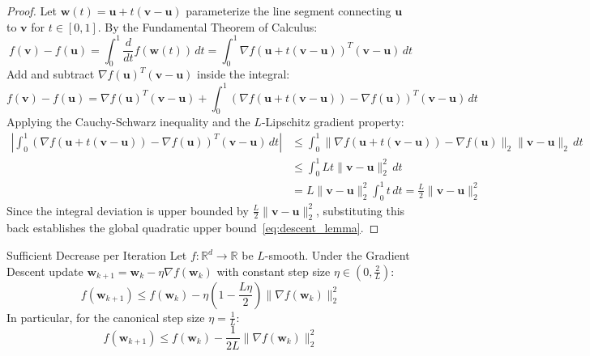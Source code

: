 \begin{proof}
Let $\mathbf{w}(t) = \mathbf{u} + t(\mathbf{v} - \mathbf{u})$ parameterize the line segment connecting $\mathbf{u}$ to $\mathbf{v}$ for $t \in [0, 1]$. By the Fundamental Theorem of Calculus:
\begin{equation}
f(\mathbf{v}) - f(\mathbf{u}) = \int_0^1 \frac{d}{dt} f(\mathbf{w}(t)) \, dt = \int_0^1 \nabla f(\mathbf{u} + t(\mathbf{v} - \mathbf{u}))^T (\mathbf{v} - \mathbf{u}) \, dt
\end{equation}
Add and subtract $\nabla f(\mathbf{u})^T (\mathbf{v} - \mathbf{u})$ inside the integral:
\begin{equation}
f(\mathbf{v}) - f(\mathbf{u}) = \nabla f(\mathbf{u})^T (\mathbf{v} - \mathbf{u}) + \int_0^1 \left( \nabla f(\mathbf{u} + t(\mathbf{v} - \mathbf{u})) - \nabla f(\mathbf{u}) \right)^T (\mathbf{v} - \mathbf{u}) \, dt
\end{equation}
Applying the Cauchy-Schwarz inequality and the $L$-Lipschitz gradient property:
\begin{align}
\left| \int_0^1 \left( \nabla f(\mathbf{u} + t(\mathbf{v} - \mathbf{u})) - \nabla f(\mathbf{u}) \right)^T (\mathbf{v} - \mathbf{u}) \, dt \right|
&\le \int_0^1 \|\nabla f(\mathbf{u} + t(\mathbf{v} - \mathbf{u})) - \nabla f(\mathbf{u})\|_2 \|\mathbf{v} - \mathbf{u}\|_2 \, dt \nonumber \\
&\le \int_0^1 L t \|\mathbf{v} - \mathbf{u}\|_2^2 \, dt \nonumber \\
&= L \|\mathbf{v} - \mathbf{u}\|_2^2 \int_0^1 t \, dt = \frac{L}{2} \|\mathbf{v} - \mathbf{u}\|_2^2
\end{align}
Since the integral deviation is upper bounded by $\frac{L}{2} \|\mathbf{v} - \mathbf{u}\|_2^2$, substituting this back establishes the global quadratic upper bound~\eqref{eq:descent_lemma}.
\end{proof}

\begin{theorembox}{Sufficient Decrease per Iteration}
Let $f: \mathbb{R}^d \to \mathbb{R}$ be $L$-smooth. Under the Gradient Descent update $\mathbf{w}_{k+1} = \mathbf{w}_k - \eta \nabla f(\mathbf{w}_k)$ with constant step size $\eta \in \left(0, \frac{2}{L}\right)$:
\begin{equation}
f(\mathbf{w}_{k+1}) \le f(\mathbf{w}_k) - \eta \left( 1 - \frac{L\eta}{2} \right) \|\nabla f(\mathbf{w}_k)\|_2^2
\label{eq:sufficient_decrease}
\end{equation}
In particular, for the canonical step size $\eta = \frac{1}{L}$:
\begin{equation}
f(\mathbf{w}_{k+1}) \le f(\mathbf{w}_k) - \frac{1}{2L} \|\nabla f(\mathbf{w}_k)\|_2^2
\label{eq:canonical_decrease}
\end{equation}
\end{theorembox}

